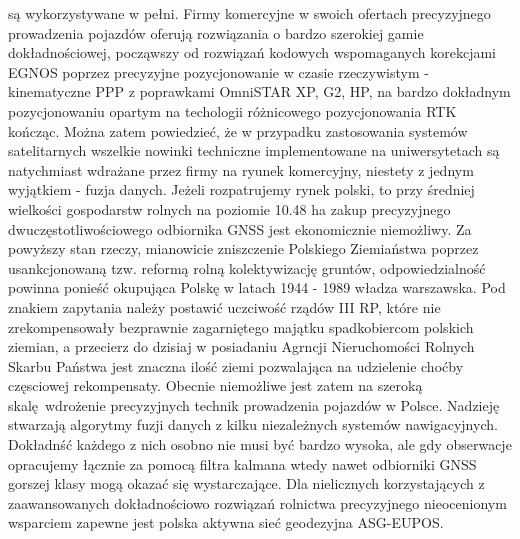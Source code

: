 są wykorzystywane w pełni. Firmy komercyjne w swoich ofertach precyzyjnego prowadzenia pojazdów oferują rozwiązania o bardzo szerokiej gamie dokładnościowej,
począwszy od rozwiązań kodowych wspomaganych korekcjami EGNOS poprzez precyzyjne pozycjonowanie w czasie rzeczywistym - kinematyczne PPP z poprawkami OmniSTAR XP, G2, HP, na 
bardzo dokładnym pozycjonowaniu opartym na techologii różnicowego pozycjonowania RTK kończąc. Można zatem powiedzieć, że w przypadku zastosowania systemów satelitarnych 
wszelkie nowinki techniczne implementowane na uniwersytetach są natychmiast wdrażane przez firmy na ryunek komercyjny, niestety z jednym wyjątkiem - fuzja danych.\newline
\indent Jeżeli rozpatrujemy rynek polski, to przy średniej wielkości gospodarstw rolnych na poziomie 10.48 ha \cite[]{ARIMR} zakup
precyzyjnego dwuczęstotliwościowego odbiornika GNSS jest ekonomicznie niemożliwy. Za powyższy stan rzeczy, mianowicie zniszczenie Polskiego Ziemiaństwa 
poprzez usankcjonowaną tzw. reformą rolną kolektywizację gruntów, odpowiedzialność powinna ponieść okupująca Polskę w latach 1944 - 1989 władza warszawska.
Pod znakiem zapytania należy postawić uczciwość rządów III RP, które nie zrekompensowały bezprawnie zagarniętego majątku spadkobiercom polskich ziemian, 
a przecierz do dzisiaj w posiadaniu Agrncji Nieruchomości Rolnych Skarbu Państwa jest znaczna ilość ziemi pozwalająca na udzielenie choćby częsciowej rekompensaty. 
Obecnie niemożliwe jest zatem na szeroką skalę wdrożenie precyzyjnych technik prowadzenia pojazdów w Polsce.
Nadzieję stwarzają algorytmy fuzji danych z kilku niezależnych systemów nawigacyjnych. Dokładnść każdego z nich osobno nie musi być bardzo wysoka,
ale gdy obserwacje opracujemy łącznie za pomocą filtra kalmana wtedy nawet odbiorniki GNSS gorszej klasy mogą okazać się wystarczające.
Dla nielicznych korzystających z zaawansowanych dokładnościowo rozwiązań rolnictwa precyzyjnego nieocenionym wsparciem zapewne jest polska aktywna sieć
geodezyjna ASG-EUPOS.




